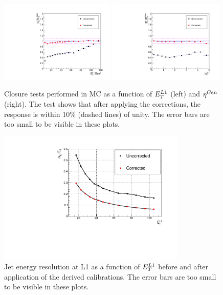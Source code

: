 \begin{figure}
\begin{center}
\includegraphics[width=0.49\textwidth]{detector/l1jet/rspvspt.pdf}
\includegraphics[width=0.49\textwidth]{detector/l1jet/rspvseta.pdf}
\caption{Closure tests performed in MC as a function of $E_{T}^{L1}$ (left) and $\eta^{Gen}$ (right). 
The test shows that after applying the corrections, the response is within 10\% (dashed lines) of unity. 
The error bars are too small to be visible in these plots.}
\end{center}
\label{fig:closure}
\end{figure}

\begin{figure}
\begin{center}
\includegraphics[width=0.8\textwidth]{detector/l1jet/MCresolution.pdf}
\caption{Jet energy resolution at L1 as a function of $E_{T}^{L1}$ before and after application of the derived calibrations.
 The error bars are too small to be visible in these plots.}
\end{center}
\label{fig:mcresolutionl1}
\end{figure}


